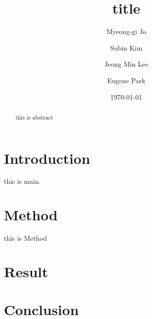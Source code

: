\documentclass[%
 aip,
amsmath,amssymb,
reprint,
]{revtex4-1}
\begin{document}

\title[Intermediate Physics Laboratory 2, Module 4]{title}
\author{Myeong-gi Jo}
\author{Subin Kim}
\author{Jeong Min Lee}
\author{Eugene Park}

\date{\today}
\begin{abstract}
this is abstract
\end{abstract}

\maketitle

\section{\label{sec:Intro} Introduction} 
this is main. 

\section{\label{sec:Method} Method}
this is Method\cite{chua_circuit}

\section{\label{sec:Result} Result}
\section{\label{sec:Conclusion} Conclusion}



\end{document}
